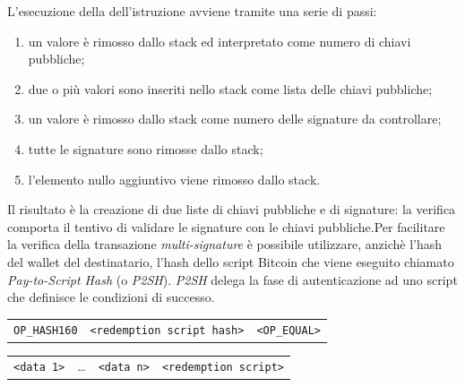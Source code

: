 L'esecuzione della dell'istruzione avviene tramite una serie di passi:
\begin{enumerate}
    \item un valore è rimosso dallo stack ed interpretato come numero di chiavi pubbliche;
    \item due o più valori sono inseriti nello stack come lista delle chiavi pubbliche;
    \item un valore è rimosso dallo stack come numero delle signature da controllare;
    \item tutte le signature sono rimosse dallo stack;
    \item l'elemento nullo aggiuntivo viene rimosso dallo stack.
\end{enumerate}
Il risultato è la creazione di due liste di chiavi pubbliche e di signature: la verifica comporta il tentivo di validare le signature con le chiavi pubbliche.\newline Per facilitare la verifica della transazione \textit{multi-signature} è possibile utilizzare, anzichè l'hash del wallet del destinatario, l'hash dello script Bitcoin che viene eseguito chiamato \textit{Pay-to-Script Hash} (o \textit{P2SH}). \textit{P2SH} delega la fase di autenticazione ad uno script che definisce le condizioni di successo.\\
\begin{table}[H]
    \centering
    \begin{tabular}{c|c|c}
        \texttt{OP\_HASH160} & \texttt{<redemption script hash>} & \texttt{<OP\_EQUAL>}
    \end{tabular}
\end{table}
\begin{table}[H]
    \centering
    \begin{tabular}{c|c|c|c}
        \texttt{<data 1>} & \dots & \texttt{<data n>} & \texttt{<redemption script>}
    \end{tabular}
\end{table}

